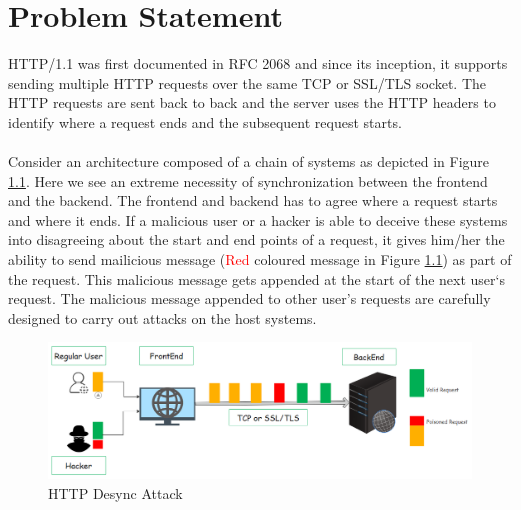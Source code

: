 \chapter{Problem Statement}
HTTP/1.1 was first documented in RFC 2068 \cite{b9} and since its inception, it supports sending multiple HTTP requests over the same TCP or SSL/TLS socket. The HTTP requests are sent back to back and the server uses the HTTP headers to identify where a request ends and the subsequent request starts. \\\\
Consider an architecture composed of a chain of systems as depicted in Figure \ref{fig:HTTP Desync Attack}. Here we see an extreme necessity of synchronization between the frontend and the backend. The frontend and backend has to agree where a request starts and where it ends. If a malicious user or a hacker is able to deceive these systems into disagreeing about the start and end points of a request, it gives him/her the ability to send mailicious message (\textcolor{red}{Red} coloured message in Figure \ref{fig:HTTP Desync Attack}) as part of the request. This malicious message gets appended at the start of the next user`s request. The malicious message appended to other user's requests are carefully designed to carry out attacks on the host systems. 

\begin{figure}
	\includegraphics[width=14cm]{images/HTTP_Desync}
	\caption{HTTP Desync Attack}
	\label{fig:HTTP Desync Attack}
\end{figure}

